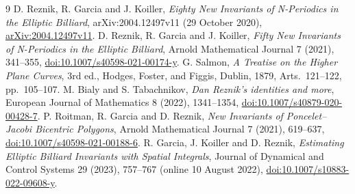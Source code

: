\documentclass[10pt]{article}
\begin{document}
\begin{thebibliography}{9}
 D. Reznik, R. Garcia and J. Koiller,
\emph{Eighty New Invariants of N-Periodics in the Elliptic Billiard},
arXiv:2004.12497v11 (29 October 2020),
\href{https://arxiv.org/abs/2004.12497v11}{arXiv:2004.12497v11}.
 D. Reznik, R. Garcia and J. Koiller,
\emph{Fifty New Invariants of N-Periodics in the Elliptic Billiard},
Arnold Mathematical Journal 7 (2021), 341--355,
\href{https://doi.org/10.1007/s40598-021-00174-y}{doi:10.1007/s40598-021-00174-y}.
 G. Salmon,
\emph{A Treatise on the Higher Plane Curves}, 3rd ed.,
Hodges, Foster, and Figgis, Dublin, 1879, Arts.~121--122, pp.~105--107.
 M. Bialy and S. Tabachnikov,
\emph{Dan Reznik's identities and more},
European Journal of Mathematics 8 (2022), 1341--1354,
\href{https://doi.org/10.1007/s40879-020-00428-7}{doi:10.1007/s40879-020-00428-7}.
 P. Roitman, R. Garcia and D. Reznik,
\emph{New Invariants of Poncelet--Jacobi Bicentric Polygons},
Arnold Mathematical Journal 7 (2021), 619--637,
\href{https://doi.org/10.1007/s40598-021-00188-6}{doi:10.1007/s40598-021-00188-6}.
 R. Garcia, J. Koiller and D. Reznik,
\emph{Estimating Elliptic Billiard Invariants with Spatial Integrals},
Journal of Dynamical and Control Systems 29 (2023), 757--767
(online 10 August 2022),
\href{https://doi.org/10.1007/s10883-022-09608-y}{doi:10.1007/s10883-022-09608-y}.
\end{thebibliography}
\end{document}
